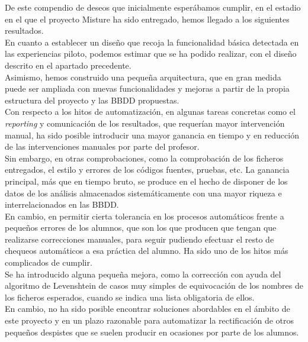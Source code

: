 De este compendio de deseos que inicialmente esperábamos cumplir, en el estadio en el que el proyecto Misture ha sido entregado, hemos llegado a los siguientes resultados.\\


En cuanto a establecer un diseño que recoja la funcionalidad básica detectada en las experiencias piloto, podemos estimar que se ha podido realizar, con el diseño descrito en el apartado precedente.\\


Asimismo, hemos construido una pequeña arquitectura, que en gran medida puede ser ampliada con nuevas funcionalidades y mejoras a partir de la propia estructura del proyecto y las BBDD propuestas.\\


Con respecto a los hitos de automatización, en algunas tareas concretas como el \textit{reporting} y comunicación de los resultados, que requerían mayor intervención manual, ha sido posible introducir una mayor ganancia en tiempo y en reducción de las intervenciones manuales por parte del profesor.\\


Sin embargo, en otras comprobaciones, como la comprobación de los ficheros entregados, el estilo y errores de los códigos fuentes, pruebas, etc. La ganancia principal, más que en tiempo bruto, se produce en el hecho de disponer de los datos de los análisis almacenados sistemáticamente con una mayor riqueza e interrelacionados en las BBDD.\\


En cambio, en permitir cierta tolerancia en los procesos automáticos frente a pequeños errores de los alumnos, que son los que producen que tengan que realizarse correcciones manuales, para seguir pudiendo efectuar el resto de chequeos automáticos a esa práctica del alumno. Ha sido uno de los hitos más complicados de cumplir.\\


Se ha introducido alguna pequeña mejora, como la corrección con ayuda del algoritmo de Levenshtein de casos muy simples de equivocación de los nombres de los ficheros esperados, cuando se indica una lista obligatoria de ellos.\\


En cambio, no ha sido posible encontrar soluciones abordables en el ámbito de este proyecto y en un plazo razonable para automatizar la rectificación de otros pequeños despistes que se suelen producir en ocasiones por parte de los alumnos.\\


